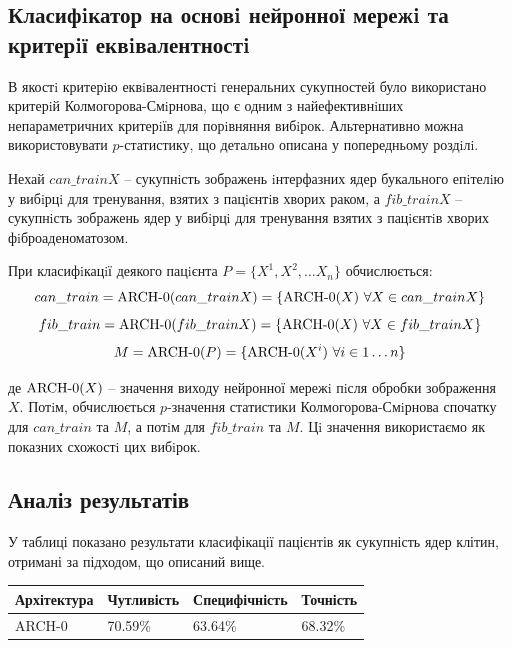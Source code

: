 \subsection{Класифiкатор на основi нейронної мережi та критерiї еквiвалентностi}

В якостi критерiю еквiвалентностi генеральних сукупностей було використано критерiй Колмогорова-Смiрнова, що є одним з найефективнiших непараметричних критерiїв для порiвняння вибiрок. Альтернативно можна використовувати \(p\)-статистику, що детально описана у попередньому роздiлi. 

Нехай \(can\_trainX\) -- сукупнiсть зображень iнтерфазних ядер букального епiтелiю у вибiрцi для тренування, взятих з пацiєнтiв хворих раком, а \(fib\_trainX\) -- сукупнiсть зображень ядер у вибiрцi для тренування взятих з пацiєнтiв хворих фiброаденоматозом.  

При класифiкацiї деякого пацiєнта \(P = \{X^1, X^2, \dots X_n\} \) обчислюється: 
\begin{equation*}
can\_train = \textup{ARCH-0}(can\_trainX) = \{\textup{ARCH-0}(X)\,\, \forall X \in can\_trainX\}
\end{equation*}
\begin{equation*}
fib\_train = \textup{ARCH-0}(fib\_trainX) = \{\textup{ARCH-0}(X)\,\, \forall X \in fib\_trainX\}
\end{equation*}
\begin{equation*}
M = \textup{ARCH-0}(P) = \{\textup{ARCH-0}(X^i)\,\, \forall i \in 1 \dots n\}
\end{equation*}

де \(\textup{ARCH-0}(X)\) -- значення виходу нейронної мережi пiсля обробки зображення \(X\). Потiм, обчислюється \(p\)-значення статистики Колмогорова-Смiрнова спочатку для \(can\_train\) та \(M\), а потiм для \(fib\_train\) та \(M\). Цi значення використаємо як показних схожостi цих вибiрок.

\subsection{Аналіз результатів}

У таблиці показано результати класифікації пацієнтів як сукупність ядер клітин, отримані за підходом, що описаний вище.

\begin{center}
	\begin{tabular}
		{| m{3cm} || m{3cm} | m{3cm} | m{3cm} |}
		\hline
		Архітектура & Чутливість & Специфічність & Точність \\ \hline \hline
		ARCH-0 & 70.59\%  & 63.64\%  & 68.32\%  \\ \hline
	\end{tabular}
\end{center}

